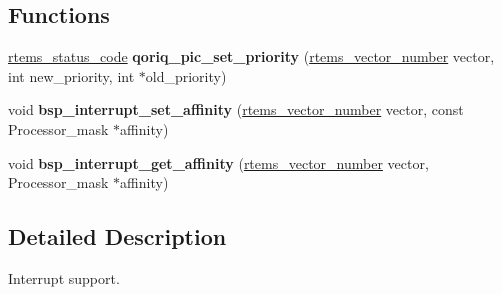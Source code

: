 \subsection*{Functions}
\begin{DoxyCompactItemize}
\item 
\mbox{\label{group__RTEMSBSPsPowerPCQorIQInterrupt_ga826df02d8c7a3c1194d2e5cd7c739f0f}} 
\mbox{\hyperlink{group__ClassicStatus_ga545d41846817eaba6143d52ee4d9e9fe}{rtems\+\_\+status\+\_\+code}} {\bfseries qoriq\+\_\+pic\+\_\+set\+\_\+priority} (\mbox{\hyperlink{group__ClassicINTR_ga3e434c197d99f128e78cae4d9358bd8b}{rtems\+\_\+vector\+\_\+number}} vector, int new\+\_\+priority, int $\ast$old\+\_\+priority)
\item 
\mbox{\label{group__RTEMSBSPsPowerPCQorIQInterrupt_ga8925aa2097da48998f8a610686f63180}} 
void {\bfseries bsp\+\_\+interrupt\+\_\+set\+\_\+affinity} (\mbox{\hyperlink{group__ClassicINTR_ga3e434c197d99f128e78cae4d9358bd8b}{rtems\+\_\+vector\+\_\+number}} vector, const Processor\+\_\+mask $\ast$affinity)
\item 
\mbox{\label{group__RTEMSBSPsPowerPCQorIQInterrupt_ga3996d9afea8476b04bb432f07e199cd0}} 
void {\bfseries bsp\+\_\+interrupt\+\_\+get\+\_\+affinity} (\mbox{\hyperlink{group__ClassicINTR_ga3e434c197d99f128e78cae4d9358bd8b}{rtems\+\_\+vector\+\_\+number}} vector, Processor\+\_\+mask $\ast$affinity)
\end{DoxyCompactItemize}


\subsection{Detailed Description}
Interrupt support. 

